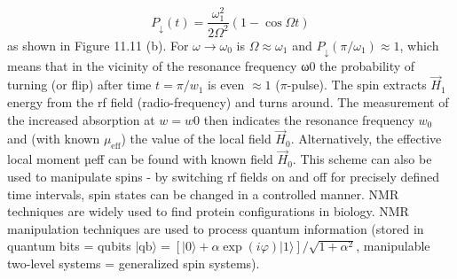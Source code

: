 \begin{equation}
    P_{\downarrow}(t)=\frac{\omega_{1}^{2}}{2 \Omega^{2}}(1-\cos \Omega t)
    \end{equation}
as shown in Figure 11.11 (b). For $\omega \rightarrow \omega_{0}$ is $\Omega \approx \omega_{1}$ and $P_{\downarrow}\left(\pi / \omega_{1}\right) \approx 1$, which means that in the vicinity of the resonance frequency ω0 the probability of turning (or flip) after time $t = \pi / w_1$ is even $\approx 1$ ($\pi$-pulse). The spin extracts $\vec{H}_1$ energy from the rf field (radio-frequency) and turns around. The measurement of the increased absorption at $w = w0$ then indicates the resonance frequency $w_0$ and (with known $\mu_{\text{eff}}$) the value of the local field $\vec{H}_0$. Alternatively, the effective local moment µeff can be found with known field $\vec{H}_0$. This scheme can also be used to manipulate spins - by switching rf fields on and off for precisely defined time intervals, spin states can be changed in a controlled manner. NMR techniques are widely used to find protein configurations in biology. NMR manipulation techniques are used to process quantum information (stored in quantum bits = qubits $|\mathrm{qb}\rangle=[|0\rangle+\alpha \exp (i \varphi)|1\rangle] / \sqrt{1+\alpha^{2}}$, manipulable two-level systems = generalized spin systems).


